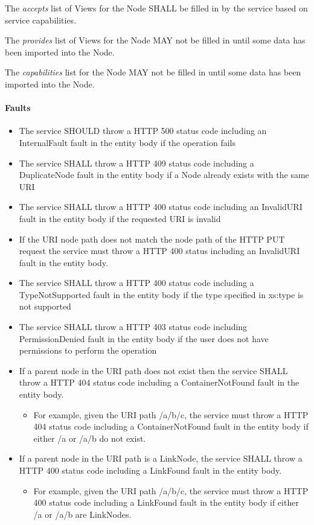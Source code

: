 \documentclass[11pt,a4paper]{ivoa}
\begin{document}
The \emph{accepts} list of Views for the Node SHALL be filled in by the service based on service capabilities.

The \emph{provides} list of Views for the Node MAY not be filled in until some data has been imported into the Node.

The \emph{capabilities} list for the Node MAY not be filled in until some data has been imported into the Node.

\paragraph{Faults}
\begin{itemize}
    \item The service SHOULD throw a HTTP 500 status code including an InternalFault fault in the entity body if the operation fails
    \item The service SHALL throw a HTTP 409 status code including a DuplicateNode fault in the entity body if a Node already exists with the same URI
    \item The service SHALL throw a HTTP 400 status code including an InvalidURI fault in the entity body if the requested URI is invalid
    \item If the URI node path does not match the node path of the HTTP PUT request the service must throw a HTTP 400 status including an InvalidURI fault in the entity body.
    \item The service SHALL throw a HTTP 400 status code including a TypeNotSupported fault in the entity body if the type specified in xs:type is not supported
    \item The service SHALL throw a HTTP 403 status code including PermissionDenied fault in the entity body if the user does not have permissions to perform the operation
    \item If a parent node in the URI path does not exist then the service SHALL throw a HTTP 404 status code including a ContainerNotFound fault in the entity body.
    \begin{itemize}
        \item For example, given the URI path /a/b/c, the service must throw a HTTP 404 status code including a ContainerNotFound fault in the entity body if either /a or /a/b do not exist.
    \end{itemize}
    \item If a parent node in the URI path is a LinkNode, the service SHALL throw a HTTP 400 status code including a LinkFound fault in the entity body.
        \begin{itemize}
        \item For example, given the URI path /a/b/c, the service must throw a HTTP 400 status code including a LinkFound fault in the entity body if either /a or /a/b are LinkNodes.
    \end{itemize}
\end{itemize}
\end{document}
